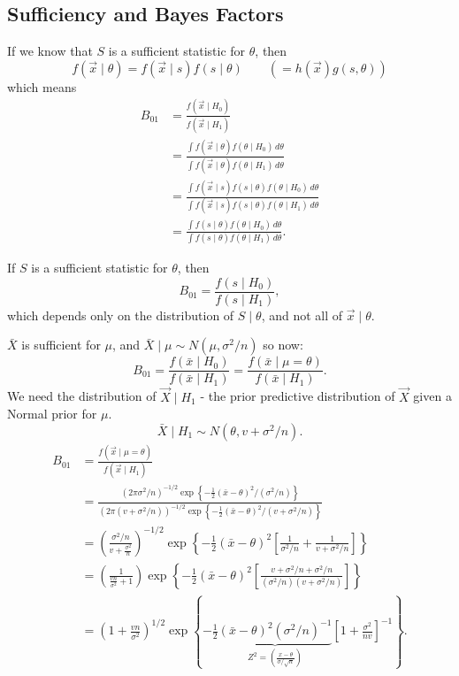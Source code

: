 \documentclass[10pt, a4paper]{article}
\begin{document}
\subsection{Sufficiency and Bayes Factors}
If we know that $S$ is a sufficient statistic for $\theta$,
then
\[
f(\vec{x} \mid \theta) = f(\vec{x} \mid s)f(s\mid \theta)\qquad (=h(\vec{x})g(s, \theta))
\]
which means
\begin{align*}
    B_{01} &= \frac{f(\vec{x} \mid H_0)}{f(\vec{x} \mid H_1)} \\
    &= \frac{\int f(\vec{x}\mid\theta)f(\theta \mid H_0)\,d\theta}{\int f(\vec{x}\mid \theta)f(\theta \mid H_1)\,d\theta} \\
    &= \frac{\int f(\vec{x}\mid s)f(s \mid \theta)f(\theta \mid H_0)\,d\theta}{\int f(\vec{x}\mid s)f(s \mid \theta)f(\theta \mid H_1)\,d\theta} \\
    &= \frac{\int f(s \mid \theta)f(\theta \mid H_0)\,d\theta}{\int f(s \mid \theta)f(\theta \mid H_1)\,d\theta}.
\end{align*}

\begin{proposition}
    If $S$ is a sufficient statistic for $\theta$,
    then
    \[
    B_{01} = \frac{f(s \mid H_0)}{f(s \mid H_1)},
    \]
    which depends only on the distribution of $S \mid \theta$,
    and not all of $\vec{x} \mid \theta$.
\end{proposition}

\begin{example}
    $\bar{X}$ is sufficient for $\mu$,
    and $\bar{X} \mid \mu \sim N(\mu, \sigma ^ 2 / n)$ so now:
    \[
    B_{01} = \frac{f(\bar{x} \mid H_0)}{f(\bar{x} \mid H_1)} = \frac{f(\bar{x} \mid \mu = \theta)}{f(\bar{x} \mid H_1)}.
    \]
    We need the distribution of $\vec{X} \mid H_1$ -
    the prior predictive distribution of $\vec{X}$ given a Normal prior for $\mu$.
    \[
    \bar{X} \mid H_1 \sim N(\theta, v + \sigma ^ 2 / n).
    \]
    \begin{align*}
        B_{01} &= \frac{f(\vec{x} \mid \mu = \theta)}{f(\vec{x} \mid H_1)} \\
        &= \frac{(2\pi\sigma ^ 2 / n) ^ {-1 / 2}\exp\left\{-\frac{1}{2}(\bar{x} - \theta) ^ 2/ (\sigma ^ 2 / n)\right\}}{(2\pi(v + \sigma ^ 2 / n)) ^ {-1 / 2}\exp\left\{-\frac{1}{2}(\bar{x} - \theta) ^ 2/ (v + \sigma ^ 2 / n)\right\}} \\
        &= \left(\frac{\sigma ^ 2 / n}{v + \frac{\sigma ^ 2}{n}}\right) ^ {-1 / 2}\exp\left\{-\frac{1}{2}(\bar{x} - \theta) ^ 2\left[\frac{1}{\sigma ^ 2 / n} + \frac{1}{v + \sigma ^ 2 / n}\right]\right\} \\
        &= \left(\frac{1}{\frac{vn}{\sigma ^ 2} + 1}\right)\exp\left\{-\frac{1}{2}(\bar{x} - \theta) ^ 2\left[\frac{v + \sigma ^ 2 / n + \sigma ^ 2 / n}{(\sigma ^ 2 / n)(v + \sigma ^ 2 / n)}\right]\right\} \\
        &= \left(1 + \frac{vn}{\sigma ^ 2}\right) ^ {1 / 2}\exp\left\{-\frac{1}{2}\underbrace{(\bar{x} - \theta) ^ 2(\sigma ^ 2 / n) ^ {-1}}_{Z ^ 2 = \left(\frac{x - \theta}{\sigma / \sqrt{n}}\right)}\left[1 + \frac{\sigma ^ 2}{nv}\right] ^ {-1}\right\}.
    \end{align*}
\end{example}
\end{document}
